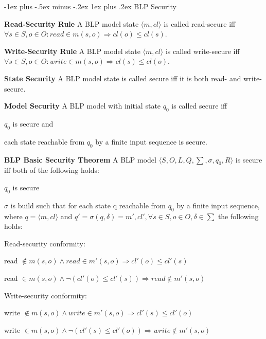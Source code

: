 \documentclass[a4paper]{article}
\makeatletter
\renewcommand{\note}[2]{\begin{noteBox} \textbf{#1} #2 \end{noteBox}}
\renewcommand{\subsubsection}{\@startsection{subsubsection}{3}{0mm}%
                {-1ex plus -.5ex minus -.2ex}%
                {1ex plus .2ex}%
                {\normalfont\small\bfseries}}
\makeatother
\begin{document}
\begin{multicols}{3}
    \subsubsection{BLP Security}
    \note{Read-Security Rule}{A BLP model state $\langle m,cl\rangle$ is called read-secure iff $\forall s\in S,o\in O:read\in m(s,o)\Rightarrow cl(o) \leq cl(s)$.}

    \note{Write-Security Rule}{A BLP model state $\langle m,cl\rangle$ is called write-secure iff $\forall s\in S,o\in O:write\in m(s,o)\Rightarrow cl(s)\leq cl(o)$.}

    \note{State Security}{A BLP model state is called secure iff it is both read- and write-secure.}

    \note{Model Security}{A BLP model with initial state $q_0$ is called secure iff
        \begin{enumerate*}
            \item $q_0$ is secure and
            \item each state reachable from $q_0$ by a finite input sequence is secure.
        \end{enumerate*}
    }

    \note{BLP Basic Security Theorem}{A BLP model $\langle S,O,L,Q,\sum,\sigma,q_0,R\rangle$ is secure iff both of the following holds:
        \begin{enumerate*}
            \item $q_0$ is secure
            \item $\sigma$ is build such that for each state q reachable from $q_0$ by a finite input sequence, where $q=\langle m,cl\rangle$ and $q'=\sigma(q,\delta)=m',cl',\forall s\in S, o\in O,\delta\in\sum$ the following holds:
        \end{enumerate*}
        \begin{itemize*}
            \item Read-security conformity:
            \begin{itemize*}
                \item read $\not\in m(s,o)\wedge read\in m'(s,o)\Rightarrow cl'(o)\leq cl'(s)$
                \item read $\in m(s,o) \wedge\lnot (cl'(o)\leq cl'(s)) \Rightarrow read \not\in m'(s,o)$
            \end{itemize*}
            \item Write-security conformity:
            \begin{itemize*}
                \item write $\not\in m(s,o)\wedge write \in m'(s,o)\Rightarrow cl'(s)\leq cl'(o)$
                \item write $\in m(s,o)\wedge\lnot(cl'(s)\leq cl'(o)) \Rightarrow write \not\in m'(s,o)$
            \end{itemize*}
        \end{itemize*}
    }


\end{multicols}
\end{document}
